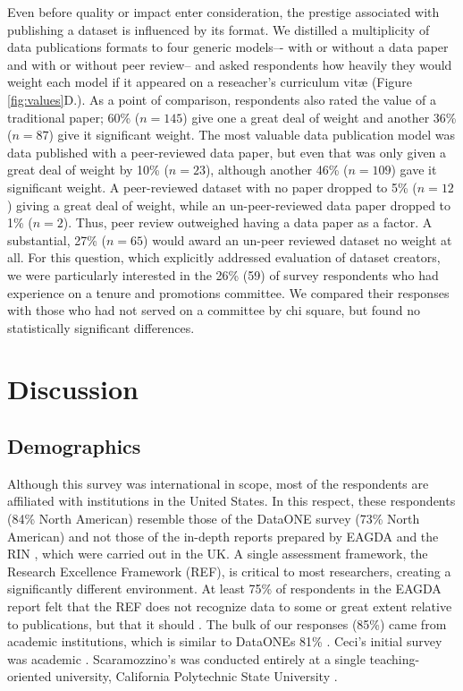\documentclass[10pt]{article}
\begin{document}
Even before quality or impact enter consideration, the prestige associated with publishing a dataset is influenced by its format.
We distilled a multiplicity of data publications formats to four generic models–- with or without a data paper and with or without peer review-- and asked respondents how heavily they would weight each model if it appeared on a reseacher's curriculum vit{\ae} (Figure \ref{fig:values}D.).
As a point of comparison, respondents also rated the value of a traditional paper; 60\% ($n=145$) give one a great deal of weight and another 36\% ($n=87$) give it significant weight.
The most valuable data publication model was data published with a peer-reviewed data paper, but even that was only given a great deal of weight by 10\% ($n=23$), although another 46\% ($n=109$) gave it significant weight.
A peer-reviewed dataset with no paper dropped to 5\% ($n=12$) giving a great deal of weight, while an un-peer-reviewed data paper dropped to 1\% ($n=2$).
Thus, peer review outweighed having a data paper as a factor. 
A substantial, 27\% ($n=65$) would award an un-peer reviewed dataset no weight at all.
For this question, which explicitly addressed evaluation of dataset creators, we were particularly interested in the 26\% (59) of survey respondents who had experience on a tenure and promotions committee.
We compared their responses with those who had not served on a committee by chi square, but found no statistically significant differences.


\section*{Discussion}

\subsection*{Demographics}

Although this survey was international in scope, most of the respondents are affiliated with institutions in the United States.
In this respect, these respondents (84\% North American) resemble those of the DataONE survey \cite{tenopir_data_2011} (73\% North American) and not those of the in-depth reports prepared by EAGDA \cite{bobrow_establishing_2014} and the RIN \cite{swan_share_2008}, which were carried out in the UK.
A single assessment framework, the Research Excellence Framework (REF), is critical to most researchers, creating a significantly different environment.
At least 75\% of respondents in the EAGDA report felt that the REF does not recognize data to some or great extent relative to publications, but that it should \cite{bobrow_establishing_2014}.
The bulk of our responses (85\%) came from academic institutions, which is similar to DataONEs 81\% \cite{tenopir_data_2011}.  
Ceci's initial survey was academic \cite{ceci_scientists_1988}.
Scaramozzino's was conducted entirely at a single teaching-oriented university, California Polytechnic State University \cite{scaramozzino_study_2012}. 
\end{document}
